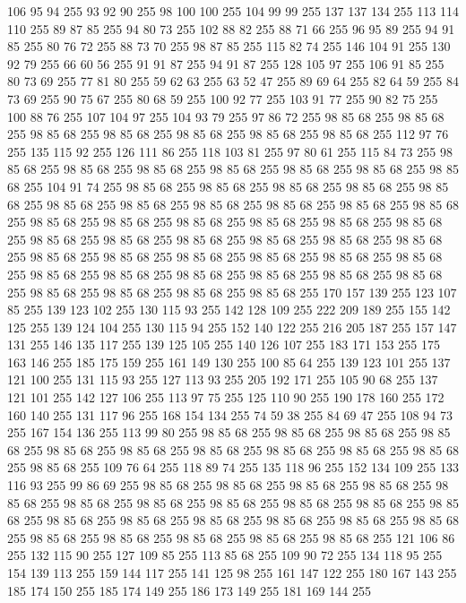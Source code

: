 106 95 94 255 93 92 90 255 98 100 100 255 104 99 99 255 137 137 134 255 113 114 110 255 89 87 85 255 94 80 73 255 102 88 82 255 88 71 66 255 96 95 89 255 94 91 85 255 80 76 72 255 88 73 70 255 98 87 85 255 115 82 74 255 146 104 91 255 130 92 79 255 66 60 56 255 91 91 87 255 94 91 87 255 128 105 97 255 106 91 85 255 80 73 69 255 77 81 80 255 59 62 63 255 63 52 47 255 89 69 64 255 82 64 59 255 84 73 69 255 90 75 67 255 80 68 59 255 100 92 77 255 103 91 77 255 90 82 75 255 100 88 76 255 107 104 97 255 104 93 79 255 97 86 72 255 98 85 68 255 98 85 68 255 98 85 68 255 98 85 68 255 98 85 68 255 98 85 68 255 98 85 68 255 112 97 76 255 135 115 92 255 126 111 86 255 118 103 81 255 97 80 61 255 115 84 73 255 98 85 68 255 98 85 68 255 98 85 68 255 98 85 68 255 98 85 68 255 98 85 68 255 98 85 68 255 104 91 74 255 98 85 68 255 98 85 68 255 98 85 68 255 98 85 68 255
98 85 68 255 98 85 68 255 98 85 68 255 98 85 68 255 98 85 68 255 98 85 68 255 98 85 68 255 98 85 68 255 98 85 68 255 98 85 68 255 98 85 68 255 98 85 68 255 98 85 68 255 98 85 68 255 98 85 68 255 98 85 68 255 98 85 68 255 98 85 68 255 98 85 68 255 98 85 68 255 98 85 68 255 98 85 68 255 98 85 68 255 98 85 68 255 98 85 68 255 98 85 68 255 98 85 68 255 98 85 68 255 98 85 68 255 98 85 68 255 98 85 68 255 98 85 68 255 98 85 68 255 98 85 68 255 98 85 68 255 170 157 139 255 123 107 85 255 139 123 102 255 130 115 93 255 142 128 109 255 222 209 189 255 155 142 125 255 139 124 104 255 130 115 94 255 152 140 122 255 216 205 187 255 157 147 131 255 146 135 117 255 139 125 105 255 140 126 107 255 183 171 153 255 175 163 146 255 185 175 159 255 161 149 130 255 100 85 64 255 139 123 101 255 137 121 100 255 131 115 93 255 127 113 93 255 205 192 171 255 105 90 68 255 137 121 101 255 142 127 106 255 113 97 75 255
125 110 90 255 190 178 160 255 172 160 140 255 131 117 96 255 168 154 134 255 74 59 38 255 84 69 47 255 108 94 73 255 167 154 136 255 113 99 80 255 98 85 68 255 98 85 68 255 98 85 68 255 98 85 68 255 98 85 68 255 98 85 68 255 98 85 68 255 98 85 68 255 98 85 68 255 98 85 68 255 98 85 68 255 109 76 64 255 118 89 74 255 135 118 96 255 152 134 109 255 133 116 93 255 99 86 69 255 98 85 68 255 98 85 68 255 98 85 68 255 98 85 68 255 98 85 68 255 98 85 68 255 98 85 68 255 98 85 68 255 98 85 68 255 98 85 68 255 98 85 68 255 98 85 68 255 98 85 68 255 98 85 68 255 98 85 68 255 98 85 68 255 98 85 68 255 98 85 68 255 98 85 68 255 98 85 68 255 98 85 68 255 98 85 68 255 121 106 86 255 132 115 90 255 127 109 85 255 113 85 68 255 109 90 72 255 134 118 95 255 154 139 113 255 159 144 117 255 141 125 98 255 161 147 122 255 180 167 143 255 185 174 150 255 185 174 149 255 186 173 149 255 181 169 144 255
